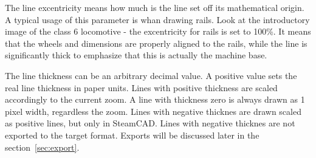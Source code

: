 The line excentricity means how much is the line set off its mathematical origin.
A typical usage of this parameter is whan drawing rails. Look at the introductory
image of the class 6 locomotive - the excentricity for rails is set to 100\%.
It means that the wheels and dimensions are properly aligned to the rails, while
the line is significantly thick to emphasize that this is actually the machine
base.

The line thickness can be an arbitrary decimal value. A positive value sets the
real line thickness in paper units. Lines with positive thickness are scaled
accordingly to the current zoom. A line with thickness zero is always drawn
as 1 pixel width, regardless the zoom. Lines with negative thicknes are drawn
scaled as positive lines, but only in SteamCAD. Lines with negative
thicknes are not exported to the target format. Exports will be discussed later
in the section~\ref{sec:export}.


